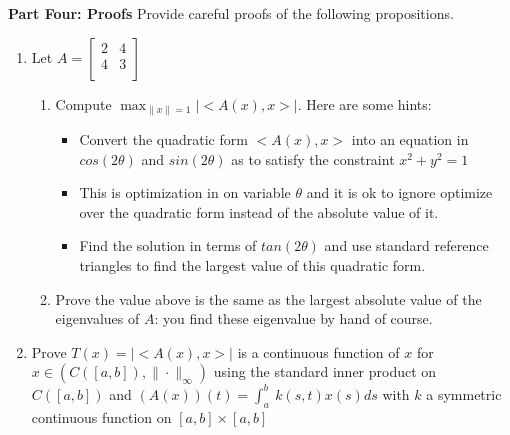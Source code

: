 \documentclass[11pt]{SelfArxOneColBMN}
\begin{document}
\textbf{Part Four: Proofs}
Provide careful proofs of the following propositions.
\begin{enumerate}
  \item Let $A =
  \begin{bmatrix}
    2 & 4\\
    4 & 3\\
  \end{bmatrix}
  $
  \begin{enumerate}[label=\alph*)]
    \item Compute $\max_{\|x\|=1}|<A(x),x>|$. Here are some hints:
    \begin{itemize}
      \item Convert the quadratic form $<A(x),x>$ into an equation in $cos(2\theta)$ and $sin(2\theta)$ as to satisfy the constraint $x^2 + y^2 = 1$
      \item This is optimization in on variable $\theta$ and it is ok to ignore optimize over the quadratic form instead of the absolute value of it.
      \item Find the solution in terms of $tan(2\theta)$ and use standard reference triangles to find the largest value of this quadratic form.
    \end{itemize}
    \item Prove the value above is the same as the largest absolute value of the eigenvalues of $A$: you find these eigenvalue by hand of course.
  \end{enumerate}
  \item Prove $T(x) = |<A(x),x>|$ is a continuous function of $x$ for $x \in (C([a,b]),\|\cdot\|_\infty)$ using the standard inner product on $C([a,b])$ and $(A(x))(t) = \int_a^b\:k(s,t)x(s)ds$ with $k$ a symmetric continuous function on $[a,b]\times[a,b]$
\end{enumerate}
\end{document}
